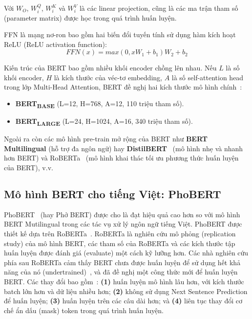 Với $W_O$, $W_i^Q$, $W_i^K$ và $W_i^V$ là các linear projection, cũng là các ma trận tham số (parameter matrix) được học trong quá trình huấn luyện.


FFN là mạng nơ-ron bao gồm hai biến đổi tuyến tính sử dụng hàm kích hoạt ReLU (ReLU activation function):
\[ FFN(x) = max(0,xW_1 + b_1)W_2 + b_2 \]

Kiến trúc của BERT bao gồm nhiều khối encoder chồng lên nhau. Nếu $L$ là số khối encoder, $H$ là kích thước của véc-tơ embedding, $A$ là số self-attention head trong lớp Multi-Head Attention, BERT đề nghị hai kích thước mô hình
chính~\cite{devlinBERTPretrainingDeep2019}:
\begin{itemize}
	\item \textbf{BERT\textsubscript{BASE}} (L=12, H=768, A=12, 110 triệu tham số).
	\item \textbf{BERT\textsubscript{LARGE}} (L=24, H=1024, A=16, 340 triệu tham số).
\end{itemize}

Ngoài ra còn các mô hình pre-train mở rộng của BERT như \textbf{BERT Multilingual} (hỗ trợ đa ngôn ngữ) hay \textbf{DistilBERT}~\cite{sanhDistilBERTDistilledVersion2020} (mô hình nhẹ và nhanh hơn BERT) và RoBERTa~\cite{liuRoBERTaRobustlyOptimized2019} (mô hình khai thác tối ưu phương thức huấn luyện của BERT), v.v.

\subsection{Mô hình BERT cho tiếng Việt: PhoBERT}
PhoBERT~\cite{nguyenPhoBERTPretrainedLanguage2020} (hay Phở BERT) được cho là đạt hiệu quả cao hơn so với mô hình BERT Mutilingual trong các tác vụ xử lý ngôn ngữ tiếng Việt. PhoBERT được thiết kế dựa trên RoBERTa~\cite{liuRoBERTaRobustlyOptimized2019}. RoBERTa là nghiên cứu mô phỏng (replication study) của mô hình BERT, các tham số của RoBERTa và các kích thước tập huấn luyện được đánh giá (evaluate) một cách kỹ lưỡng hơn. Các nhà nghiên cứu phía sau RoBERTa cảm thấy BERT chưa được huấn luyện để sử dụng hết khả năng của nó (undertrained)~\cite{liuRoBERTaRobustlyOptimized2019}, và đã đề nghị một công thức mới để huấn luyện BERT. Các thay đổi bao gồm~\cite{liuRoBERTaRobustlyOptimized2019}: \textbf{(1)} huấn luyện mô hình lâu hơn, với kích thước batch lớn hơn và dữ liệu nhiều hơn; \textbf{(2)} không sử dụng Next Sentence Prediction để huấn luyện; \textbf{(3)} huấn luyện trên các câu dài hơn; và \textbf{(4)} liên tục thay đổi cơ chế ẩn dấu (mask) token trong quá trình huấn luyện.

